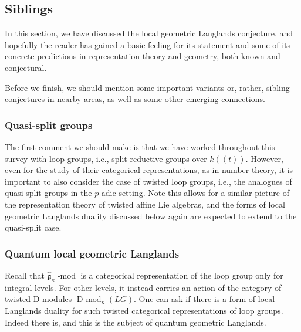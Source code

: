 \documentclass[10pt]{amsart}
\newcommand{\fgk}{\widehat{\fg}_\kappa}
\newcommand{\LS}{\on{LocSys}_{\cG}}
\newcommand{\fg}{\mathfrak{g}}
\newcommand{\on}{\operatorname}
\renewcommand{\mod}{\on{-mod}}
\newcommand{\Dmod}{\on{D-mod}}
\newcommand{\Vect}{\on{Vect}}
\theoremstyle{remark}
\newcommand{\Gr}{\operatorname{Gr}}
\numberwithin{equation}{section}
\newcommand{\cG}{\check{G}}
\renewcommand{\mod}{\operatorname{-mod}}
\newcommand{\QCoh}{\on{QCoh}}
\begin{document}
	

	
	\subsection{Siblings} \label{ss:variants}
	In this section, we have discussed the local geometric Langlands 
	conjecture, and hopefully the reader has gained a basic feeling for its 
	statement and some of its concrete predictions in representation theory and 
	geometry, both known and conjectural.
	
	 
	Before we finish, we should mention some important variants or, rather, sibling conjectures in nearby areas, as well as some 
	other emerging connections. 
	
	\subsubsection{Quasi-split groups} The first comment we should make is that we have worked throughout this survey with loop groups, i.e., split reductive groups over $k(\!(t)\!)$. However, even for the study of their categorical representations, as in number theory, it is important to also consider the case of twisted loop groups, i.e., the analogues  of quasi-split groups in the $p$-adic setting. Note this allows for a similar picture of the representation theory of twisted affine Lie algebras, and the forms of local geometric Langlands duality discussed below again are expected to extend to the quasi-split case. 
	
	
	
	
	\subsubsection{Quantum local geometric Langlands} Recall that $\fgk\mod$ 
	is  
	a categorical representation of the loop group only for integral 
	levels. For other levels, it instead carries an action of the category of 
	twisted D-modules $\Dmod_\kappa(LG)$. One can ask if there is a form of 
	local Langlands duality for such twisted categorical representations of 
	loop groups. Indeed there is, and this is the subject of quantum geometric Langlands.   
	
\end{document}
